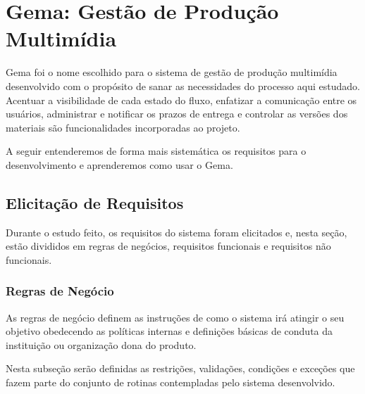 
\chapter{Gema: Gestão de Produção Multimídia}

Gema foi o nome escolhido para o sistema de gestão de produção multimídia desenvolvido com o propósito de sanar as necessidades do processo aqui estudado. Acentuar a visibilidade de cada estado do fluxo, enfatizar a comunicação entre os usuários, administrar e notificar os prazos de entrega e controlar as versões dos materiais são funcionalidades incorporadas ao projeto. 

A seguir entenderemos de forma mais sistemática os requisitos para o desenvolvimento e aprenderemos como usar o Gema.

\section{Elicitação de Requisitos}

Durante o estudo feito, os requisitos do sistema foram elicitados e, nesta seção, estão divididos em regras de negócios, requisitos funcionais e requisitos não funcionais.

\subsection{Regras de Negócio} \label{subsec:regras_de_negocio}

As regras de negócio definem as instruções de como o sistema irá atingir o seu objetivo obedecendo as políticas internas e definições básicas de conduta da instituição ou organização dona do produto.

Nesta subseção serão definidas as restrições, validações, condições e exceções que fazem parte do conjunto de rotinas contempladas pelo sistema desenvolvido.

